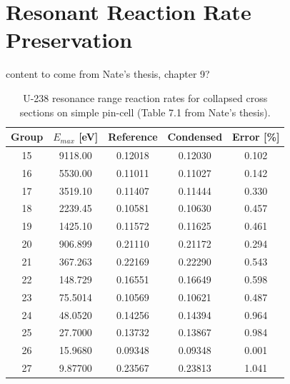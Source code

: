 \section{Resonant Reaction Rate Preservation}
\label{sec:preservation}

{\color{red} content to come from Nate's thesis, chapter 9?}

\begin{table}[h!]
  \centering
  \caption{U-238 resonance range reaction rates for collapsed cross sections on simple pin-cell {(\color{red}Table 7.1 from Nate's thesis)}.}
  \label{tab:case1-bias} 
  \begin{tabular}{c c c c c}
  \toprule
  Group & $E_{max}$ [eV] & Reference & Condensed & Error [\%] \\
  \midrule
  15 & 9118.00 & 0.12018 & 0.12030 & 0.102 \\
  16 & 5530.00 & 0.11011 & 0.11027 & 0.142 \\
  17 & 3519.10 & 0.11407 & 0.11444 & 0.330 \\
  18 & 2239.45 & 0.10581 & 0.10630 & 0.457 \\
  19 & 1425.10 & 0.11572 & 0.11625 & 0.461 \\
  20 & 906.899 & 0.21110 & 0.21172 & 0.294 \\
  21 & 367.263 & 0.22169 & 0.22290 & 0.543 \\
  22 & 148.729 & 0.16551 & 0.16649 & 0.598 \\
  23 & 75.5014 & 0.10569 & 0.10621 & 0.487 \\
  24 & 48.0520 & 0.14256 & 0.14394 & 0.964 \\
  25 & 27.7000 & 0.13732 & 0.13867 & 0.984 \\
  26 & 15.9680 & 0.09348 & 0.09348 & 0.001 \\
  27 & 9.87700 & 0.23567 & 0.23813 & 1.041 \\
  \bottomrule
\end{tabular}
\end{table}

